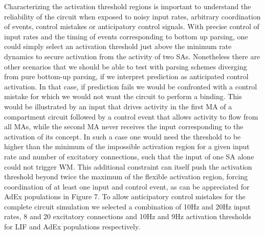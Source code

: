 \documentclass[10pt]{article}
\begin{document}
Characterizing the activation threshold regions is important to
understand the reliability of the circuit when exposed to noisy input
rates, arbitrary coordination of events, control mistakes or
anticipatory control signals. With precise control of input rates and
the timing of events corresponding to bottom up parsing, one could
simply select an activation threshold just above the minimum rate
dynamics to secure activation from the activity of two SAs.
Nonetheless there are other scenarios that we should be able to test
with parsing schemes diverging from pure bottom-up parsing, if we
interpret prediction as anticipated control activation. In that case,
if prediction fails we would be confronted with a control mistake for
which we would not want the circuit to perform a binding. This would
be illustrated by an input that drives activity in the first MA of a
compartment circuit followed by a control event that allows activity
to flow from all MAs, while the second MA never receives the input
corresponding to the activation of its concept. In such a case one
would need the threshold to be higher than the minimum of the
impossible activation region for a given input rate and number of
excitatory connections, such that the input of one SA alone could not
trigger WM. This additional constraint can itself push the activation
threshold beyond twice the maximum of the flexible activation region,
forcing coordination of at least one input and control event, as can
be appreciated for AdEx populations in Figure 7. To allow anticipatory
control mistakes for the complete circuit simulation we selected a
combination of 10Hz and 20Hz input rates, 8 and 20 excitatory
connections and 10Hz and 9Hz activation thresholds for LIF and AdEx
populations respectively.
\end{document}

